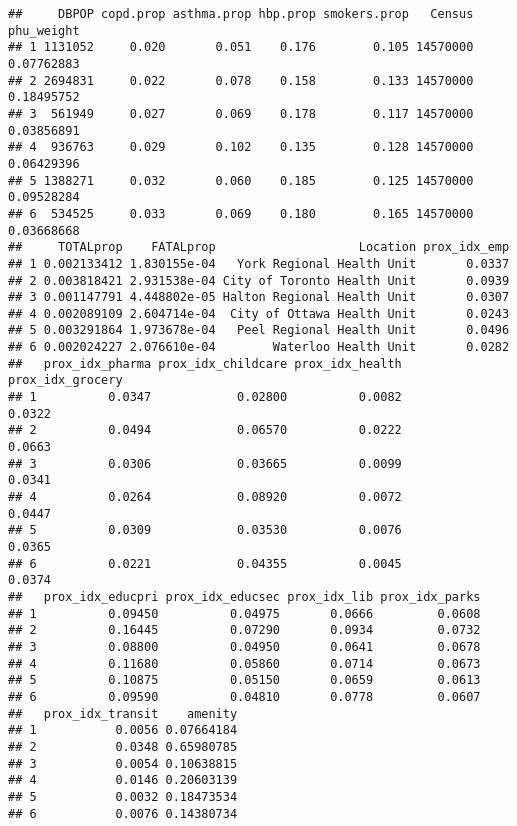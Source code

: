 \documentclass[]{article}
\newenvironment{Shaded}{\begin{snugshade}}{\end{snugshade}}
\newcommand{\KeywordTok}[1]{\textcolor[rgb]{0.13,0.29,0.53}{\textbf{#1}}}
\newcommand{\NormalTok}[1]{#1}
\newcommand{\OperatorTok}[1]{\textcolor[rgb]{0.81,0.36,0.00}{\textbf{#1}}}
\begin{document}
\begin{verbatim}
##     DBPOP copd.prop asthma.prop hbp.prop smokers.prop   Census phu_weight
## 1 1131052     0.020       0.051    0.176        0.105 14570000 0.07762883
## 2 2694831     0.022       0.078    0.158        0.133 14570000 0.18495752
## 3  561949     0.027       0.069    0.178        0.117 14570000 0.03856891
## 4  936763     0.029       0.102    0.135        0.128 14570000 0.06429396
## 5 1388271     0.032       0.060    0.185        0.125 14570000 0.09528284
## 6  534525     0.033       0.069    0.180        0.165 14570000 0.03668668
##     TOTALprop    FATALprop                    Location prox_idx_emp
## 1 0.002133412 1.830155e-04   York Regional Health Unit       0.0337
## 2 0.003818421 2.931538e-04 City of Toronto Health Unit       0.0939
## 3 0.001147791 4.448802e-05 Halton Regional Health Unit       0.0307
## 4 0.002089109 2.604714e-04  City of Ottawa Health Unit       0.0243
## 5 0.003291864 1.973678e-04   Peel Regional Health Unit       0.0496
## 6 0.002024227 2.076610e-04        Waterloo Health Unit       0.0282
##   prox_idx_pharma prox_idx_childcare prox_idx_health prox_idx_grocery
## 1          0.0347            0.02800          0.0082           0.0322
## 2          0.0494            0.06570          0.0222           0.0663
## 3          0.0306            0.03665          0.0099           0.0341
## 4          0.0264            0.08920          0.0072           0.0447
## 5          0.0309            0.03530          0.0076           0.0365
## 6          0.0221            0.04355          0.0045           0.0374
##   prox_idx_educpri prox_idx_educsec prox_idx_lib prox_idx_parks
## 1          0.09450          0.04975       0.0666         0.0608
## 2          0.16445          0.07290       0.0934         0.0732
## 3          0.08800          0.04950       0.0641         0.0678
## 4          0.11680          0.05860       0.0714         0.0673
## 5          0.10875          0.05150       0.0659         0.0613
## 6          0.09590          0.04810       0.0778         0.0607
##   prox_idx_transit    amenity
## 1           0.0056 0.07664184
## 2           0.0348 0.65980785
## 3           0.0054 0.10638815
## 4           0.0146 0.20603139
## 5           0.0032 0.18473534
## 6           0.0076 0.14380734
\end{verbatim}

\begin{Shaded}
\end{Shaded}
\end{document}
